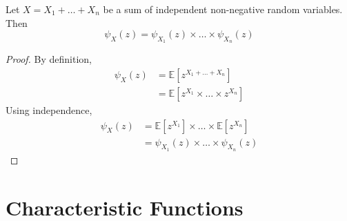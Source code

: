 \documentclass[11pt]{report} %
\begin{document}
\begin{theorem}
Let $X = X_{1} + \dots + X_{n}$ be a sum of independent non-negative random variables. Then
\begin{equation}
\psi_{X}\left(z\right) = \psi_{X_{1}}\left(z\right)\times\dots\times \psi_{X_{n}}\left(z\right)
\end{equation} 
\end{theorem}
\begin{proof}
By definition,
\begin{align}
\psi_{X}\left(z\right) &= \mathbb{E}\left[z^{X_{1} + \dots + X_{n}}\right] \\
&= \mathbb{E}\left[z^{X_{1}}\times\dots\times z^{X_{n}}\right]
\end{align}
Using independence,
\begin{align}
\psi_{X}\left(z\right) &= \mathbb{E}\left[z^{X_{1}}\right]\times\dots\times \mathbb{E}\left[z^{X_{n}}\right] \\
&= \psi_{X_{1}}\left(z\right)\times\dots\times \psi_{X_{n}}\left(z\right)
\end{align}
\end{proof}

\section{Characteristic Functions}
\end{document}
